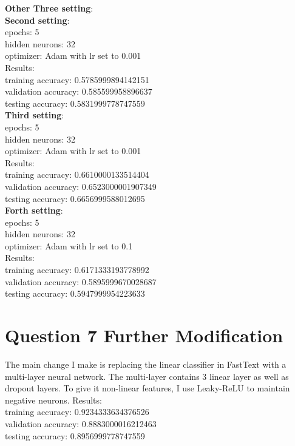 \documentclass{article} %
\begin{document}
\textbf{Other Three setting}:\\
\textbf{Second setting}:\\
epochs: 5\\
hidden neurons: 32\\
optimizer: Adam with lr set to 0.001\\
Results:\\
training accuracy: 0.5785999894142151\\
validation accuracy: 0.585599958896637\\
testing accuracy: 0.5831999778747559\\
\textbf{Third setting}:\\
epochs: 5\\
hidden neurons: 32\\
optimizer: Adam with lr set to 0.001\\
Results:\\
training accuracy: 0.6610000133514404\\
validation accuracy: 0.6523000001907349\\
testing accuracy: 0.6656999588012695\\

\textbf{Forth setting}:\\
epochs: 5\\
hidden neurons: 32\\
optimizer: Adam with lr set to 0.1\\
Results:\\
training accuracy: 0.6171333193778992\\
validation accuracy: 0.5895999670028687\\
testing accuracy: 0.5947999954223633\\


\section*{Question 7 Further Modification}
The main change I make is replacing the linear classifier in FastText with a 
multi-layer neural network. The multi-layer contains 3 linear layer as well as 
dropout layers. To give it non-linear features, I use Leaky-ReLU to maintain 
negative neurons.
Results:\\
training accuracy: 0.9234333634376526\\
validation accuracy: 0.8883000016212463\\
testing accuracy: 0.8956999778747559\\
\end{document}
